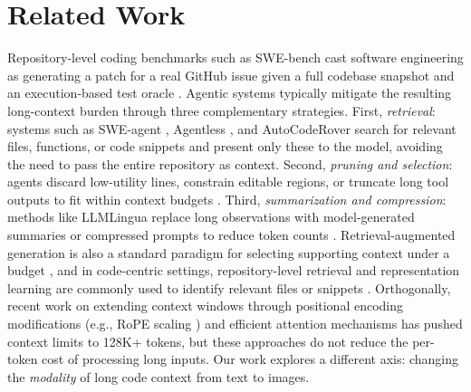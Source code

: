 \section{Related Work}

Repository-level coding benchmarks such as SWE-bench cast software engineering as generating a patch for a real GitHub issue given a full codebase snapshot and an execution-based test oracle \cite{jimenez2023swebench,openai2024swebenchverified}. Agentic systems typically mitigate the resulting long-context burden through three complementary strategies. First, \emph{retrieval}: systems such as SWE-agent \cite{yang2024sweagent}, Agentless \cite{xia2024agentless}, and AutoCodeRover \cite{zhang2024autocoderover} search for relevant files, functions, or code snippets and present only these to the model, avoiding the need to pass the entire repository as context. Second, \emph{pruning and selection}: agents discard low-utility lines, constrain editable regions, or truncate long tool outputs to fit within context budgets \cite{yao2022react,schick2023toolformer}. Third, \emph{summarization and compression}: methods like LLMLingua replace long observations with model-generated summaries or compressed prompts to reduce token counts \cite{jiang2023llmlingua}. Retrieval-augmented generation is also a standard paradigm for selecting supporting context under a budget \cite{lewis2020rag,karpukhin2020dpr,robertson2009bm25}, and in code-centric settings, repository-level retrieval and representation learning are commonly used to identify relevant files or snippets \cite{zhang2023repocoder,feng2020codebert,guo2020graphcodebert,guo2022unixcoder}. Orthogonally, recent work on extending context windows through positional encoding modifications (e.g., RoPE scaling \cite{su2024rope}) and efficient attention mechanisms \cite{dao2022flashattention} has pushed context limits to 128K+ tokens, but these approaches do not reduce the per-token cost of processing long inputs. Our work explores a different axis: changing the \emph{modality} of long code context from text to images.

